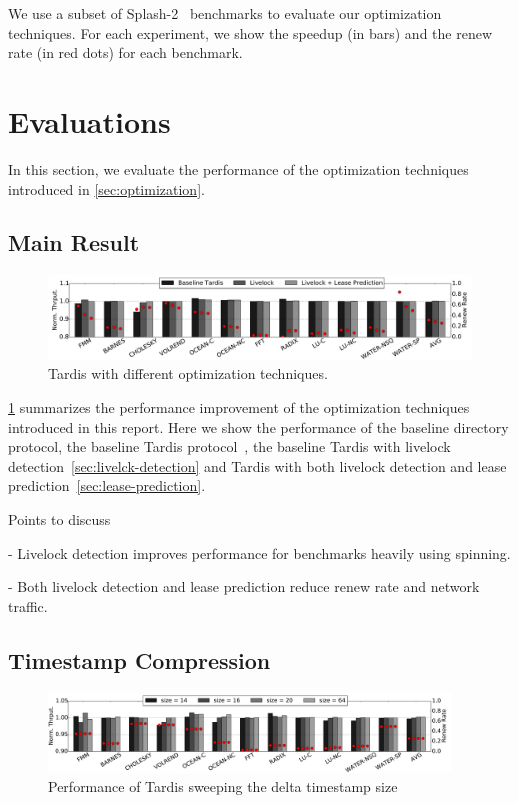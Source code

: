 \documentclass[12pt]{article}
\begin{document}
We use a subset of Splash-2~\cite{splash2} benchmarks to evaluate our 
optimization techniques. For each experiment, we show the speedup (in 
bars) and the renew rate (in red dots) for each benchmark.

\section{Evaluations}

In this section, we evaluate the performance of the optimization 
techniques introduced in \cref{sec:optimization}.

\subsection{Main Result}

\begin{figure}
	\centering
	\includegraphics[width=0.95\columnwidth]{figs/main.pdf}
	\caption{ Tardis with different optimization techniques.}
	\label{fig:main}
\end{figure}

\cref{fig:main} summarizes the performance improvement of the 
optimization techniques introduced in this report. Here we show the 
performance of the baseline directory protocol, the baseline Tardis 
protocol~\cite{yu2015}, the baseline Tardis with livelock 
detection~\cref{sec:livelck-detection} and Tardis with both livelock 
detection and lease prediction~\cref{sec:lease-prediction}.

Points to discuss

- Livelock detection improves performance for benchmarks heavily using 
  spinning.

- Both livelock detection and lease prediction reduce renew rate and 
  network traffic.

\subsection{Timestamp Compression}

\begin{figure}
	\centering
	\includegraphics[width=0.95\textwidth]{figs/tssize.pdf}
	\caption{ Performance of Tardis sweeping the delta timestamp size}
	\label{fig:tssize}
\end{figure}
\end{document}

